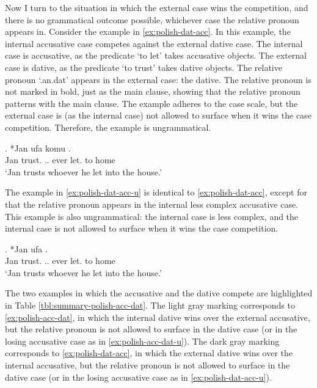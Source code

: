Now I turn to the situation in which the external case wins the competition, and there is no grammatical outcome possible, whichever case the relative pronoun appears in.
Consider the example in \ref{ex:polish-dat-acc}. In this example, the internal accusative case competes against the external dative case.
The internal case is accusative, as the predicate  `to let' takes accusative objects.
The external case is dative, as the predicate  `to trust' takes dative objects.
The relative pronoun  `.\ac{an}.\ac{dat}' appears in the external case: the dative. The relative pronoun is not marked in bold, just as the main clause, showing that the relative pronoun patterns with the main clause.
The example adheres to the case scale, but the external case is (as the internal case) not allowed to surface when it wins the case competition. Therefore, the example is ungrammatical.

\exg. *Jan ufa komu    .\\
Jan trust.\scsub{[dat]} .. ever let.\scsub{[acc]} to home\\
`Jan trusts whoever he let into the house.' \label{ex:polish-dat-acc}

The example in \ref{ex:polish-dat-acc-u} is identical to \ref{ex:polish-dat-acc}, except for that the relative pronoun appears in the internal less complex accusative case. This example is also ungrammatical: the internal case is less complex, and the internal case is not allowed to surface when it wins the case competition.

\exg. *Jan ufa     .\\
Jan trust.\scsub{[dat]} .. ever let.\scsub{[acc]} to home\\
`Jan trusts whoever he let into the house.' \label{ex:polish-dat-acc-u}

The two examples in which the accusative and the dative compete are highlighted in Table \ref{tbl:summary-polish-acc-dat}.
The light gray marking corresponds to \ref{ex:polish-acc-dat}, in which the internal dative wins over the external accusative, but the relative pronoun is not allowed to surface in the dative case (or in the losing accusative case as in \ref{ex:polish-acc-dat-u}).
The dark gray marking corresponds to \ref{ex:polish-dat-acc}, in which the external dative wins over the internal accusative, but the relative pronoun is not allowed to surface in the dative case (or in the losing accusative case as in \ref{ex:polish-dat-acc-u}).

